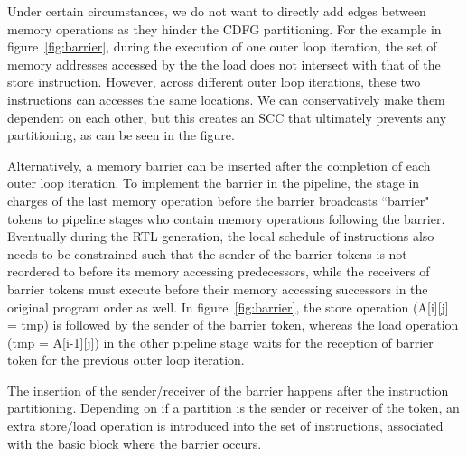 Under certain circumstances, we do not want to directly add edges between memory operations
as they hinder the CDFG partitioning. For the example in figure~\ref{fig:barrier}, during the execution of one outer loop iteration, the set of memory addresses accessed by the the load does not intersect
with that of the store instruction. However, across different outer loop iterations, these
two instructions can accesses the same locations. 
We can conservatively make them dependent
on each other, but this creates an SCC that ultimately prevents any partitioning, as can be
seen in the figure.



Alternatively, a memory barrier can be inserted after the completion of 
each outer loop iteration. 
To implement the barrier in the pipeline, the stage in charges of the last 
memory operation before the barrier broadcasts ``barrier" tokens to pipeline stages who contain memory operations following the barrier. 
Eventually during the RTL generation, the local schedule of instructions also needs to be constrained such that the sender of the barrier tokens is not reordered to before its memory accessing predecessors, while the receivers of barrier tokens must execute before their memory accessing successors in the original program order as well.
In figure~\ref{fig:barrier}, the store operation (A[i][j] = tmp) is followed by the sender of the barrier token, whereas the load operation (tmp = A[i-1][j]) in the other pipeline stage waits for the reception of barrier token for the previous outer loop iteration.


The insertion of the sender/receiver of the barrier happens after the instruction partitioning. Depending on if a partition is the sender or receiver of the token,
an extra store/load operation is introduced into the set of instructions, associated
with the basic block where the barrier occurs.


